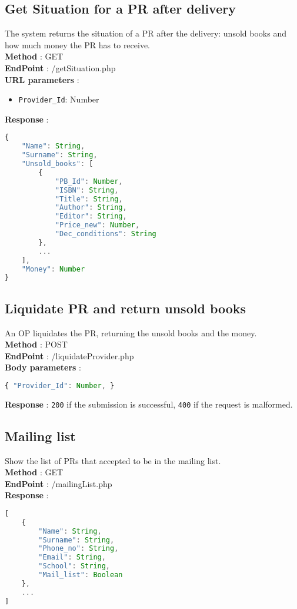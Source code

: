 \subsection{Get Situation for a PR after delivery}
The system returns the situation of a PR after the delivery: unsold books and how much money the PR has to receive.\\
\textbf{Method} : GET \\
\textbf{EndPoint} : /getSituation.php \\
\textbf{URL parameters} :
\begin{itemize}
    \item \texttt{Provider\_Id}: Number
\end{itemize}
\textbf{Response} :
\begin{lstlisting}[language=JavaScript, label={lst:jscode}, basicstyle=\ttfamily]
{
    "Name": String,
    "Surname": String,
    "Unsold_books": [
        {
            "PB_Id": Number,
            "ISBN": String,
            "Title": String,
            "Author": String,
            "Editor": String,
            "Price_new": Number,
            "Dec_conditions": String
        },
        ...
    ],
    "Money": Number
}
\end{lstlisting}

\subsection{Liquidate PR and return unsold books}
An OP liquidates the PR, returning the unsold books and the money.\\
\textbf{Method} : POST \\
\textbf{EndPoint} : /liquidateProvider.php \\
\textbf{Body parameters} :
\begin{lstlisting}[language=JavaScript, label={lst:jscode}, basicstyle=\ttfamily]
{ "Provider_Id": Number, }
\end{lstlisting}
\textbf{Response} : \texttt{200} if the submission is successful, \texttt{400} if the request is malformed.

\subsection{Mailing list}
Show the list of PRs that accepted to be in the mailing list.\\
\textbf{Method} : GET \\
\textbf{EndPoint} : /mailingList.php \\
\textbf{Response} :
\begin{lstlisting}[language=JavaScript, label={lst:jscode}, basicstyle=\ttfamily]
[
    {
        "Name": String,
        "Surname": String,
        "Phone_no": String,
        "Email": String,
        "School": String,
        "Mail_list": Boolean
    },
    ...
]
\end{lstlisting}

